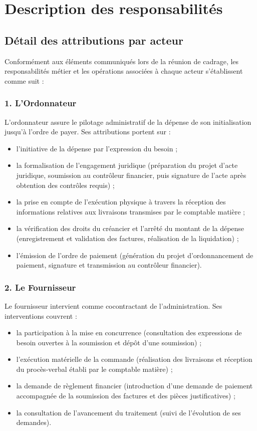 \section{Description des responsabilités}

\subsection{Détail des attributions par acteur}

Conformément aux éléments communiqués lors de la réunion de cadrage, les responsabilités métier et les opérations associées à chaque acteur s'établissent comme suit :

\subsubsection{1. L'Ordonnateur}
L'ordonnateur assure le pilotage administratif de la dépense de son initialisation jusqu'à l'ordre de payer. Ses attributions portent sur :
\begin{itemize}
  \item l'initiative de la dépense par l'expression du besoin ;
  \item la formalisation de l'engagement juridique (préparation du projet d'acte juridique, soumission au contrôleur financier, puis signature de l'acte après obtention des contrôles requis) ;
  \item la prise en compte de l'exécution physique à travers la réception des informations relatives aux livraisons transmises par le comptable matière ;
  \item la vérification des droits du créancier et l'arrêté du montant de la dépense (enregistrement et validation des factures, réalisation de la liquidation) ;
  \item l'émission de l'ordre de paiement (génération du projet d'ordonnancement de paiement, signature et transmission au contrôleur financier).
\end{itemize}

\subsubsection{2. Le Fournisseur}
Le fournisseur intervient comme cocontractant de l'administration. Ses interventions couvrent :
\begin{itemize}
  \item la participation à la mise en concurrence (consultation des expressions de besoin ouvertes à la soumission et dépôt d'une soumission) ;
  \item l'exécution matérielle de la commande (réalisation des livraisons et réception du procès-verbal établi par le comptable matière) ;
  \item la demande de règlement financier (introduction d'une demande de paiement accompagnée de la soumission des factures et des pièces justificatives) ;
  \item la consultation de l'avancement du traitement (suivi de l'évolution de ses demandes).
\end{itemize}

